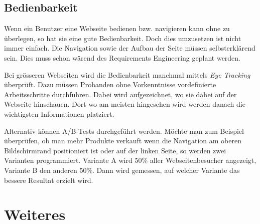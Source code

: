 \subsection{Bedienbarkeit}
Wenn ein Benutzer eine Webseite bedienen bzw. navigieren kann ohne zu überlegen, so hat sie eine gute Bedienbarkeit. Doch dies umzusetzen ist nicht immer einfach. Die Navigation sowie der Aufbau der Seite müssen selbsterklärend sein. Dies muss schon wärend des Requirements Engineering geplant werden.

Bei grösseren Webseiten wird die Bedienbarkeit manchmal mittels \textit{Eye Tracking} überprüft. Dazu müssen Probanden ohne Vorkenntnisse vordefinierte Arbeitsschritte durchführen. Dabei wird aufgezeichnet, wo sie dabei auf der Webseite hinschauen. Dort wo am meisten hingesehen wird werden danach die wichtigsten Informationen platziert.

Alternativ können A/B-Tests durchgeführt werden. Möchte man zum Beispiel überprüfen, ob man mehr Produkte verkauft wenn die Navigation am oberen Bildschirmrand positioniert ist oder auf der linken Seite, so werden zwei Varianten programmiert. Variante A wird 50\% aller Webseitenbesucher angezeigt, Variante B den anderen 50\%. Dann wird gemessen, auf welcher Variante das bessere Resultat erzielt wird.

\section{Weiteres}
